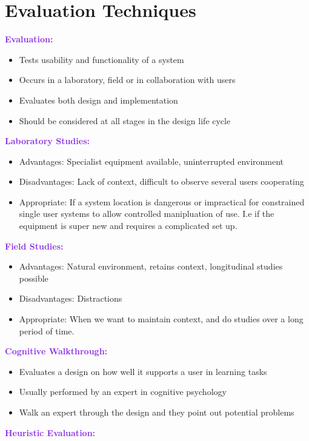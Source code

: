 \documentclass[a4paper,10pt]{article}
\begin{document}
\section*{Evaluation Techniques}
\textcolor{BlueViolet}{\textbf{Evaluation:}}
\renewcommand{\labelitemi}{\textperiodcentered}
\begin{itemize}
\item Tests usability and functionality of a system
\item Occurs in a laboratory, field or in collaboration with users 
\item Evaluates both design and implementation 
\item Should be considered at all stages in the design life cycle 
\end{itemize}
\textcolor{BlueViolet}{\textbf{Laboratory Studies:}}
\renewcommand{\labelitemi}{\textperiodcentered}
\begin{itemize}
\item Advantages: Specialist equipment available, uninterrupted environment 
\item Disadvantages: Lack of context, difficult to observe several users cooperating 
\item Appropriate: If a system location is dangerous or impractical for constrained single user systems to allow controlled manipluation of use. I.e if the equipment is super new and requires a complicated set up.
\end{itemize}
\textcolor{BlueViolet}{\textbf{Field Studies:}}
\renewcommand{\labelitemi}{\textperiodcentered}
\begin{itemize}
\item Advantages: Natural environment, retains context, longitudinal studies possible 
\item Disadvantages: Distractions 
\item Appropriate: When we want to maintain context, and do studies over a long period of time. 
\end{itemize}
\textcolor{BlueViolet}{\textbf{Cognitive Walkthrough:}}
\renewcommand{\labelitemi}{\textperiodcentered}
\begin{itemize}
\item Evaluates a design on how well it supports a user in learning tasks 
\item Usually performed by an expert in cognitive psychology 
\item Walk an expert through the design and they point out potential problems
\end{itemize}
\textcolor{BlueViolet}{\textbf{Heuristic Evaluation:}}
\end{document}

